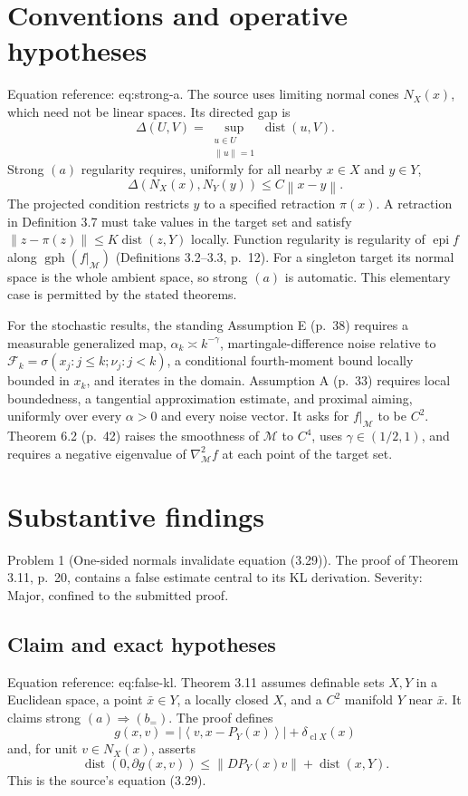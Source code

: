 \documentclass[10pt]{article}
\begin{document}
\section*{Conventions and operative hypotheses}
Equation reference: eq:strong-a. The source uses limiting normal cones \(N_X(x)\), which need not be linear spaces. Its directed gap is \[\Delta(U,V)=\sup_{\substack{u\in U\\\left\|u\right\|=1}}\mathop{\mathrm{dist}}(u,V).\] Strong \((a)\) regularity requires, uniformly for all nearby \(x\in X\) and \(y\in Y\), \[
 \Delta(N_X(x),N_Y(y))\le C\left\|x-y\right\|.\] The projected condition restricts \(y\) to a specified retraction \(\pi(x)\). A retraction in Definition 3.7 must take values in the target set and satisfy \(\left\|z-\pi(z)\right\|\le K\mathop{\mathrm{dist}}(z,Y)\) locally. Function regularity is regularity of \(\mathop{\mathrm{epi}}f\) along \(\mathop{\mathrm{gph}}(f|_{\mathcal M})\) (Definitions 3.2–3.3, p. 12). For a singleton target its normal space is the whole ambient space, so strong \((a)\) is automatic. This elementary case is permitted by the stated theorems.\par
For the stochastic results, the standing Assumption E (p. 38) requires a measurable generalized map, \(\alpha_k\asymp k^{-\gamma}\), martingale-difference noise relative to \(\mathcal F_k=\sigma(x_j:j\le k;\nu_j:j<k)\), a conditional fourth-moment bound locally bounded in \(x_k\), and iterates in the domain. Assumption A (p. 33) requires local boundedness, a tangential approximation estimate, and proximal aiming, uniformly over every \(\alpha>0\) and every noise vector. It asks for \(f|_\mathcal M\) to be \(C^2\). Theorem 6.2 (p. 42) raises the smoothness of \(\mathcal M\) to \(C^4\), uses \(\gamma\in(1/2,1)\), and requires a negative eigenvalue of \(\nabla_\mathcal M^2 f\) at each point of the target set.\par
\section*{Substantive findings}
Problem 1 (One-sided normals invalidate equation (3.29)).  The proof of Theorem 3.11, p. 20, contains a false estimate central to its KL derivation. Severity: Major, confined to the submitted proof.\par
\subsection*{Claim and exact hypotheses}
Equation reference: eq:false-kl. Theorem 3.11 assumes definable sets \(X,Y\) in a Euclidean space, a point \(\bar x\in Y\), a locally closed \(X\), and a \(C^2\) manifold \(Y\) near \(\bar x\). It claims strong \((a)\Rightarrow(b_=)\). The proof defines \[g(x,v)=|\left\langle v,x-P_Y(x)\right\rangle|+\delta_{\mathop{\mathrm{cl}}X}(x)\] and, for unit \(v\in N_X(x)\), asserts \[
 \mathop{\mathrm{dist}}(0,\partial g(x,v))
 \le \left\|DP_Y(x)v\right\|+\mathop{\mathrm{dist}}(x,Y).\] This is the source’s equation (3.29).\par
\end{document}
